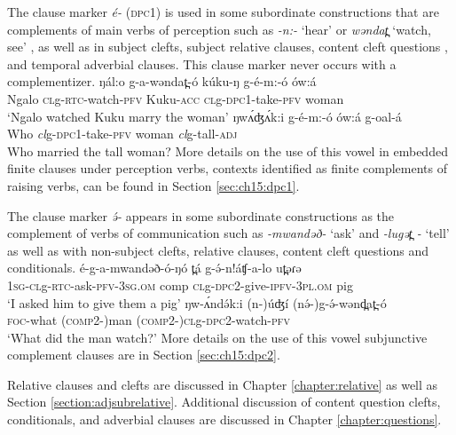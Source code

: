 The clause marker \textit{é-} (\textsc{dpc1}) is used in some subordinate constructions that are complements of main verbs of perception such as \textit{-n:-} ‘hear’ or \textit{wəndat̪ }	‘watch, see’ , as well as in subject clefts, subject relative clauses, content cleft questions , and temporal adverbial clauses. This clause marker never occurs with a complementizer.
\ea
\ea \gll	ŋál:o    g-a-wəndat̪-ó              kúku-ŋ       g-é-m:-ó                       ów:á \\
     Ngalo \textsc{cl}g-\textsc{rtc}-watch-\textsc{pfv} Kuku-\textsc{acc} \textsc{cl}g-\textsc{dpc1}-take-\textsc{pfv} woman \\
\glt 	‘Ngalo watched Kuku marry the woman’  \label{ex:ch11:dpc1a}
\ex \gll 	ŋwʌ́ʤʌ́k:i   g-é-m:-ó                      ów:á      g-oal-á\\
			Who          \textit{cl}g-\textsc{dpc1}-take-\textsc{pfv}   woman  \textit{cl}g-tall-\textsc{adj}\\
	\glt 	Who married the tall woman?	\label{ex:ch11:dpc1b}
\z 
\z
More details on the use of this vowel in embedded finite clauses under perception verbs, contexts identified as finite complements of raising verbs, can be found in Section \ref{sec:ch15:dpc1}.

The clause marker \textit{ ə́- } appears in some subordinate constructions as the complement of verbs of communication such as \textit{-mwandəð-} ‘ask’ and \textit{-lugət̪ -} ‘tell’  as well as with non-subject clefts, relative clauses, content cleft questions  and conditionals.
\ea 
\ea \gll  	é-g-a-mwandəð-ó-ŋó            t̪á      g-ə́-n!áʧ-a-lo                          ut̪əɾə\\
  	 1\textsc{sg}-\textsc{cl}g-\textsc{rtc}-ask-\textsc{pfv}-3\textsc{sg.om}  comp \textsc{cl}g-\textsc{dpc2}-give-\textsc{ipfv}-3\textsc{pl.om}   pig\\
	\glt  ‘I asked him to give them a pig’ \label{ex:ch11:dpc2a}
\ex \gll 	ŋw-ʌ́ndə́k:i       (n-)úʤí           (nə́-)g-ə́-wənd̪at̪-ó                \\         
		\textsc{foc}-what      (\textsc{comp2}-)man     (\textsc{comp2}-)\textsc{cl}g-\textsc{dpc2}-watch-\textsc{pfv}   \\
	\glt ‘What did the man watch?’ \label{ex:ch11:dpc2b}
\z
\z
More details on the use of this vowel subjunctive complement clauses are in Section \ref{sec:ch15:dpc2}. 

Relative clauses and clefts are discussed in Chapter \ref{chapter:relative} as well as Section \ref{section:adjsubrelative}. Additional discussion of content question clefts, conditionals, and adverbial clauses are discussed in Chapter \ref{chapter:questions}.

